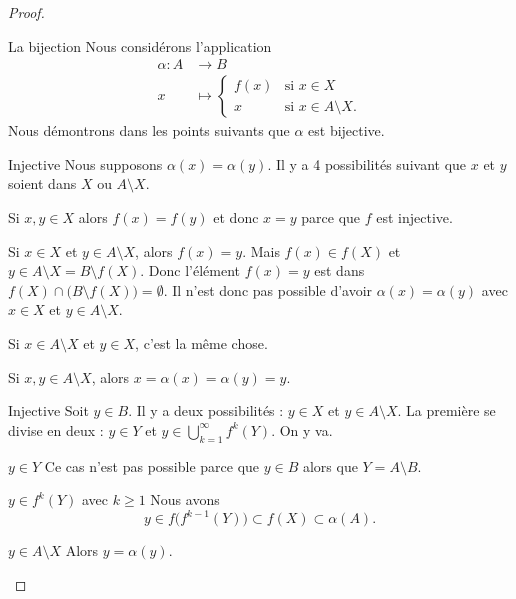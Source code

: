 \begin{proof}
\begin{subproof}
        \item[La bijection]
            Nous considérons l'application
            \begin{equation}
                \begin{aligned}
                    \alpha\colon A&\to B \\
                    x&\mapsto \begin{cases}
                        f(x)    &   \text{si } x\in X\\
                        x    &    \text{si } x\in A\setminus X.
                    \end{cases}
                \end{aligned}
            \end{equation}
            Nous démontrons dans les points suivants que \( \alpha\) est bijective.
        \item[Injective]
            Nous supposons \( \alpha(x)=\alpha(y)\). Il y a 4 possibilités suivant que \( x\) et \( y\) soient dans \( X\) ou \( A\setminus X\).

            Si \( x,y\in X\) alors \( f(x)=f(y)\) et donc \( x=y\) parce que \( f\) est injective.

            Si \( x\in X\) et \( y\in A\setminus X\), alors \( f(x)=y\). Mais \( f(x)\in f(X)\) et \( y\in A\setminus X=B\setminus f(X)\). Donc l'élément \( f(x)=y\) est dans \( f(X)\cap \big( B\setminus f(X) \big)=\emptyset\). Il n'est donc pas possible d'avoir \( \alpha(x)=\alpha(y)\) avec \( x\in X\) et \( y\in A\setminus X\).

            Si \( x\in A\setminus X\) et \( y\in X\), c'est la même chose.

            Si \( x,y\in A\setminus X\), alors \( x=\alpha(x)=\alpha(y)=y\).

        \item[Injective]
            Soit \( y\in B\). Il y a deux possibilités : \( y\in X\) et \( y\in A\setminus X\). La première se divise en deux : \( y\in Y\) et \( y\in \bigcup_{k=1}^{\infty}f^k(Y)\). On y va.

            \begin{subproof}
                \item[\( y\in Y\)]
                    Ce cas n'est pas possible parce que \( y\in B\) alors que \( Y=A\setminus B\).
                \item[\( y\in f^k(Y)\) avec \( k\geq 1\)]
                    Nous avons
                    \begin{equation}
                         y\in f\big( f^{k-1}(Y) \big)\subset f(X)\subset \alpha(A).
                    \end{equation}
                \item[\( y\in A\setminus X\)]
                    Alors \( y=\alpha(y)\).
            \end{subproof}
    \end{subproof}
\end{proof}

